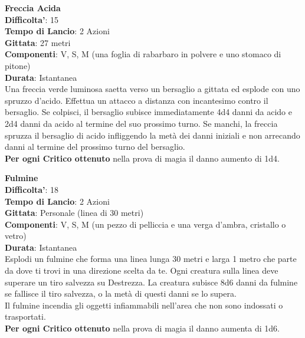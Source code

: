 \begin{multicols}{2}
\medskip\textbf{Freccia Acida}\\
\textbf{Difficolta'}: 15\\
\textbf{Tempo di Lancio}: 2 Azioni\\
\textbf{Gittata}: 27 metri\\
\textbf{Componenti}: V, S, M (una foglia di rabarbaro in polvere e uno stomaco di pitone)\\
\textbf{Durata}: Istantanea\\
Una freccia verde luminosa saetta verso un bersaglio a gittata ed esplode con uno spruzzo d’acido. Effettua un attacco a distanza con incantesimo contro il bersaglio. Se colpisci, il bersaglio subisce immediatamente 4d4 danni da acido e 2d4 danni da acido al termine del suo prossimo turno. Se manchi, la freccia spruzza il bersaglio di acido infliggendo la metà dei danni iniziali e non arrecando danni al termine del prossimo turno del bersaglio.\\
\textbf{Per ogni Critico ottenuto} nella prova di magia il danno aumento di 1d4.

\medskip\textbf{Fulmine}\\
\textbf{Difficolta'}: 18\\
\textbf{Tempo di Lancio}: 2 Azioni\\
\textbf{Gittata}: Personale (linea di 30 metri)\\
\textbf{Componenti}: V, S, M (un pezzo di pelliccia e una verga d’ambra, cristallo o vetro)\\
\textbf{Durata}: Istantanea\\
Esplodi un fulmine che forma una linea lunga 30 metri e larga 1 metro che parte da dove ti trovi in una direzione scelta da te. Ogni creatura sulla linea deve superare un tiro salvezza su Destrezza. La creatura subisce 8d6 danni da fulmine se fallisce il tiro salvezza, o la metà di questi danni se lo supera.\\
Il fulmine incendia gli oggetti infiammabili nell’area che non sono indossati o trasportati. \\
\textbf{Per ogni Critico ottenuto} nella prova di magia il danno aumenta di 1d6.


\end{multicols}
